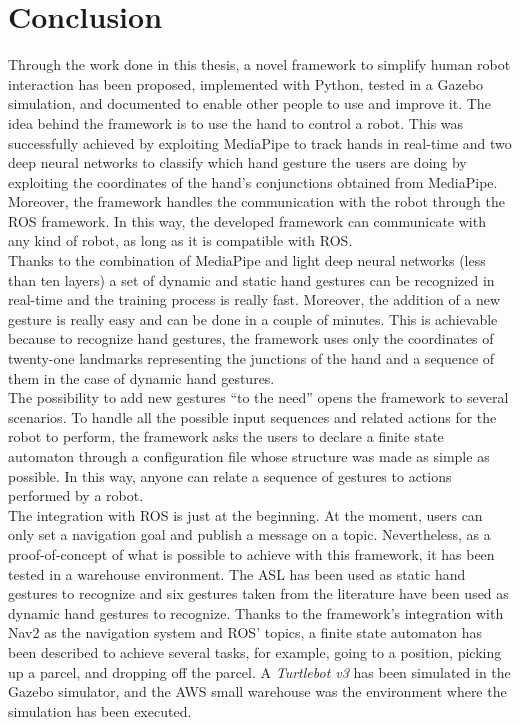 \documentclass[../thesis.tex]{subfiles}
\begin{document}
\chapter{Conclusion}\label{cap:conclusion}
Through the work done in this thesis, a novel framework to simplify human robot interaction has been proposed, implemented with Python, tested in a Gazebo simulation, and documented to enable other people to use and improve it. The idea behind the framework is to use the hand to control a robot. This was successfully achieved by exploiting MediaPipe to track hands in real-time and two deep neural networks to classify which hand gesture the users are doing by exploiting the coordinates of the hand's conjunctions obtained from MediaPipe. Moreover, the framework handles the communication with the robot through the \gls{ROS} framework. In this way, the developed framework can communicate with any kind of robot, as long as it is compatible with \gls{ROS}.\\

Thanks to the combination of MediaPipe and light deep neural networks (less than ten layers) a set of dynamic and static hand gestures can be recognized in real-time and the training process is really fast. Moreover, the addition of a new gesture is really easy and can be done in a couple of minutes. This is achievable because to recognize hand gestures, the framework uses only the coordinates of twenty-one landmarks representing the junctions of the hand and a sequence of them in the case of dynamic hand gestures.\\

The possibility to add new gestures ``to the need'' opens the framework to several scenarios. To handle all the possible input sequences and related actions for the robot to perform, the framework asks the users to declare a finite state automaton through a configuration file whose structure was made as simple as possible. In this way, anyone can relate a sequence of gestures to actions performed by a robot.\\

The integration with \gls{ROS} is just at the beginning. At the moment, users can only set a navigation goal and publish a message on a topic. Nevertheless, as a proof-of-concept of what is possible to achieve with this framework, it has been tested in a warehouse environment. The \gls{ASL} has been used as static hand gestures to recognize and six gestures taken from the literature have been used as dynamic hand gestures to recognize. Thanks to the framework's integration with Nav2 as the navigation system and \gls{ROS}' topics, a finite state automaton has been described to achieve several tasks, for example, going to a position, picking up a parcel, and dropping off the parcel. A \textit{Turtlebot v3} has been simulated in the Gazebo simulator, and the AWS small warehouse was the environment where the simulation has been executed.\\
\end{document}
